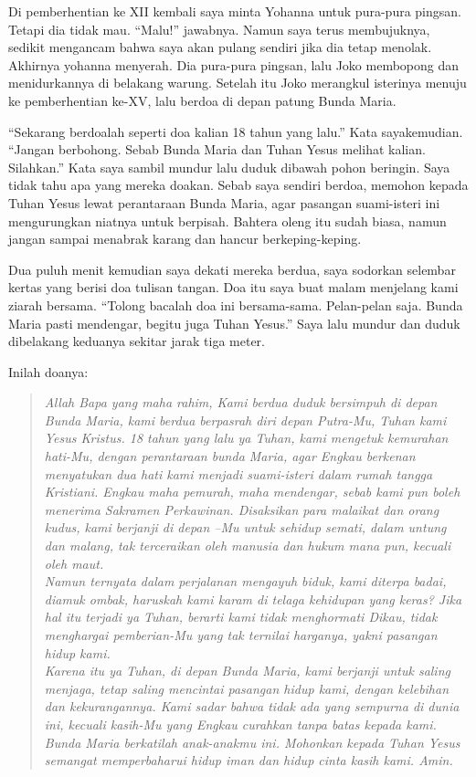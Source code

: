 Di pemberhentian ke XII kembali saya minta Yohanna untuk pura-pura pingsan. Tetapi dia tidak mau. ``Malu!'' jawabnya. Namun saya terus membujuknya, sedikit mengancam bahwa saya akan pulang sendiri jika dia tetap menolak. Akhirnya yohanna menyerah. Dia pura-pura pingsan, lalu Joko membopong dan menidurkannya di belakang warung. Setelah itu Joko merangkul isterinya menuju ke pemberhentian ke-XV, lalu berdoa di depan patung Bunda Maria.

``Sekarang berdoalah seperti doa kalian 18 tahun yang lalu.'' Kata sayakemudian. ``Jangan berbohong. Sebab Bunda Maria dan Tuhan Yesus melihat kalian. Silahkan.'' Kata saya sambil mundur lalu duduk dibawah pohon beringin.
Saya tidak tahu apa yang mereka doakan. Sebab saya sendiri berdoa, memohon kepada Tuhan Yesus lewat perantaraan Bunda Maria, agar pasangan suami-isteri ini mengurungkan niatnya untuk berpisah. Bahtera oleng itu sudah biasa, namun jangan sampai menabrak karang dan hancur berkeping-keping.

Dua puluh menit kemudian saya dekati mereka berdua, saya sodorkan selembar kertas yang berisi doa tulisan tangan. Doa itu saya buat malam menjelang kami ziarah bersama. ``Tolong bacalah doa ini bersama-sama. Pelan-pelan saja. Bunda Maria pasti mendengar, begitu juga Tuhan Yesus.'' Saya lalu mundur dan duduk dibelakang keduanya sekitar jarak tiga meter.

Inilah doanya:
\begin{quote}\textit{
Allah Bapa yang maha rahim, Kami berdua duduk bersimpuh di depan Bunda Maria, kami berdua berpasrah diri depan Putra-Mu, Tuhan kami Yesus Kristus. 18 tahun yang lalu ya Tuhan, kami mengetuk kemurahan hati-Mu, dengan perantaraan bunda Maria, agar Engkau berkenan menyatukan dua hati kami menjadi suami-isteri dalam rumah tangga Kristiani. Engkau maha pemurah, maha mendengar, sebab kami pun boleh menerima Sakramen Perkawinan. Disaksikan para malaikat dan orang kudus, kami berjanji di depan –Mu untuk sehidup semati, dalam untung dan malang, tak terceraikan oleh manusia dan hukum mana pun, kecuali oleh maut. 
\bigskip\\ 
Namun ternyata dalam perjalanan mengayuh biduk, kami diterpa badai, diamuk ombak, haruskah kami karam di telaga kehidupan yang keras? Jika hal itu terjadi ya Tuhan, berarti kami tidak menghormati Dikau, tidak menghargai pemberian-Mu yang tak ternilai harganya, yakni pasangan hidup kami. 
\bigskip\\ 
Karena itu ya Tuhan, di depan Bunda Maria, kami berjanji untuk saling menjaga, tetap saling mencintai pasangan hidup kami, dengan kelebihan dan kekurangannya. Kami sadar bahwa tidak ada yang sempurna di dunia ini, kecuali kasih-Mu yang Engkau curahkan tanpa batas kepada kami. Bunda Maria berkatilah anak-anakmu ini. Mohonkan kepada Tuhan Yesus semangat memperbaharui hidup iman dan hidup cinta kasih kami. Amin.}
\end{quote}

